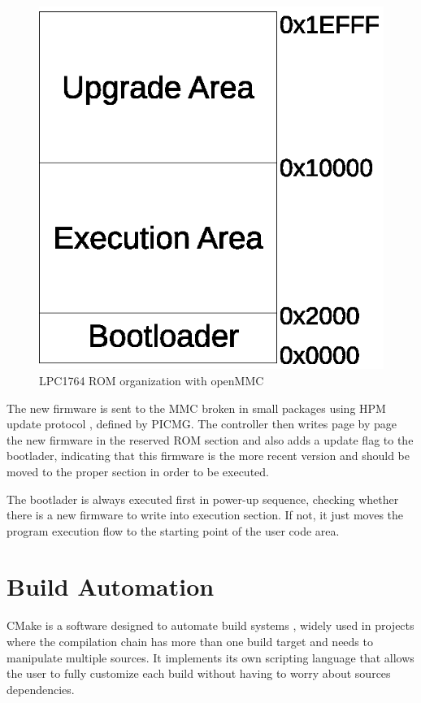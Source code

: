 \documentclass[a4paper,
              ]{jacow}
\begin{document}
\begin{figure}[!htb]
\centering
\includegraphics[scale=0.6]{bootloader-mem.eps}
\caption{LPC1764 ROM organization with openMMC}
\label{fig:bootloader-mem}
\end{figure}


The new firmware is sent to the MMC broken in small packages using HPM update protocol \cite{hpm}, defined by PICMG.
The controller then writes page by page the new firmware in the reserved ROM section and also adds a update flag to the bootlader, indicating that this firmware is the more recent version and should be moved to the proper section in order to be executed.

The bootlader is always executed first in power-up sequence, checking whether there is a new firmware to write into execution section. If not, it just moves the program execution flow to the starting point of the user code area.

\section{Build Automation}
CMake is a software designed to automate build systems \cite{cmake}, widely used in projects where the compilation chain has more than one build target and needs to manipulate multiple sources. It implements its own scripting language that allows the user to fully customize each build without having to worry about sources dependencies.
\end{document}
